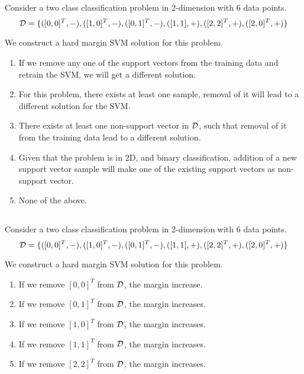 \begin{frame}
\section{}
Consider a two class classification problem in 2-dimension with 6 data points.
\[ {\cal D} = \{([0,0]^T,-), ([1,0]^T,-), ([0,1]^T,-), ([1,1],+), ([2,2]^T,+), ([2,0]^T,+)  \}\]

We construct a hard margin SVM solution for this problem.
\begin{enumerate}[label=(\Alph*)]
\item If we remove any one of the support vectors from the training data and retrain the SVM, we will get a different solution.
\item For this problem, there exists at least one sample, removal of it will lead to a different solution for the SVM.  %
\item There exists at least one non-support vector in ${\cal D}$, such that removal of it from the training data lead to a different solution.
\item Given that the problem is in 2D, and binary classification, addition of a new support vector sample will make one of the existing support vectors as non-support vector.
\item None of the above.  %
\end{enumerate}
\end{frame}


\begin{frame}
\section{}
Consider a two class classification problem in 2-dimension with 6 data points.
\[ {\cal D} = \{([0,0]^T,-), ([1,0]^T,-), ([0,1]^T,-), ([1,1],+), ([2,2]^T,+), ([2,0]^T,+)  \}\]

We construct a hard margin SVM solution for this problem.

\begin{enumerate}[label=(\Alph*)]
\item If we remove $[0,0]^T$ from ${\cal D}$, the margin increase.
\item If we remove $[0,1]^T$ from ${\cal D}$, the margin increases.
\item If we remove $[1,0]^T$ from ${\cal D}$, the margin increases.   %
\item If we remove $[1,1]^T$ from ${\cal D}$, the margin increases.   %
\item If we remove $[2,2]^T$ from ${\cal D}$, the margin increases.
\end{enumerate}
\end{frame}

